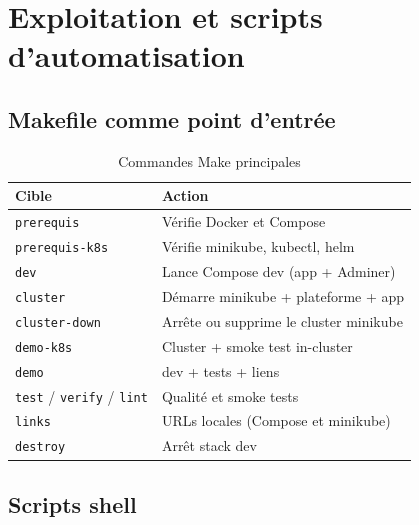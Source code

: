 \chapter{Exploitation et scripts d'automatisation}
\label{ch:exploitation}

\section{Makefile comme point d'entrée}

\begin{table}[htbp]
  \centering
  \caption{Commandes Make principales}
  \label{tab:makefile}
  \begin{tabular}{@{}lp{9cm}@{}}
    \toprule
    \textbf{Cible} & \textbf{Action} \\
    \midrule
    \texttt{prerequis} & Vérifie Docker et Compose \\
    \texttt{prerequis-k8s} & Vérifie minikube, kubectl, helm \\
    \texttt{dev} & Lance Compose dev (app + Adminer) \\
    \texttt{cluster} & Démarre minikube + plateforme + app \\
    \texttt{cluster-down} & Arrête ou supprime le cluster minikube \\
    \texttt{demo-k8s} & Cluster + smoke test in-cluster \\
    \texttt{demo} & dev + tests + liens \\
    \texttt{test} / \texttt{verify} / \texttt{lint} & Qualité et smoke tests \\
    \texttt{links} & URLs locales (Compose et minikube) \\
    \texttt{destroy} & Arrêt stack dev \\
    \bottomrule
  \end{tabular}
\end{table}

\section{Scripts shell}


